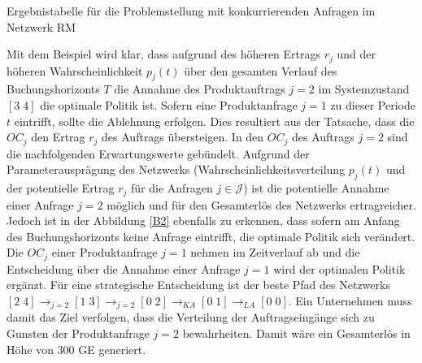 \begin{table}
\begin{footnotesize}
    \caption{Ergebnistabelle für die Problemstellung mit konkurrierenden Anfragen im Netzwerk RM} \label{Tab2}
          \begin{center}
    \vspace*{3mm}
            \end{center}
\end{footnotesize}
\end{table}

Mit dem Beispiel wird klar, dass aufgrund des höheren Ertrags $r_j$ und der höheren Wahrscheinlichkeit $p_j(t)$ über den gesamten Verlauf des Buchungshorizonts $T$ die Annahme des Produktauftrags $j=2$ im Systemzustand $[3\;4]$ die optimale Politik ist. Sofern eine Produktanfrage $j=1$ zu dieser Periode $t$ eintrifft, sollte die Ablehnung erfolgen. Dies resultiert aus der Tatsache, dass die $OC_j$ den Ertrag $r_j$ des Auftrags übersteigen. In den $OC_j$ des Auftrags $j=2$ sind die nachfolgenden Erwartungswerte gebündelt. Aufgrund der Parameterausprägung des Netzwerks (Wahrscheinlichkeitsverteilung $p_j(t)$ und der potentielle Ertrag $r_j$ für die Anfragen $j\in\mathcal{J}$) ist die potentielle Annahme einer Anfrage $j=2$ möglich und für den Gesamterlös des Netzwerks ertragreicher. Jedoch ist in der Abbildung \ref{B2} ebenfalls zu erkennen, dass sofern am Anfang des Buchungshorizonts keine Anfrage eintrifft, die optimale Politik sich verändert. Die $OC_j$ einer Produktanfrage $j=1$ nehmen im Zeitverlauf ab und die Entscheidung über die Annahme einer Anfrage $j=1$ wird der optimalen Politik ergänzt. Für eine strategische Entscheidung ist der beste Pfad des Netzwerks $[2\;4] \rightarrow_{j=2} [1\;3] \rightarrow_{j=2} [0\;2] \rightarrow_{KA} [0\;1]\rightarrow_{LA} [0\;0]$. Ein Unternehmen muss damit das Ziel verfolgen, dass die Verteilung der Auftragseingänge sich zu Gunsten der Produktanfrage $j=2$ bewahrheiten. Damit wäre ein Gesamterlös in Höhe von $300$ GE generiert. 










